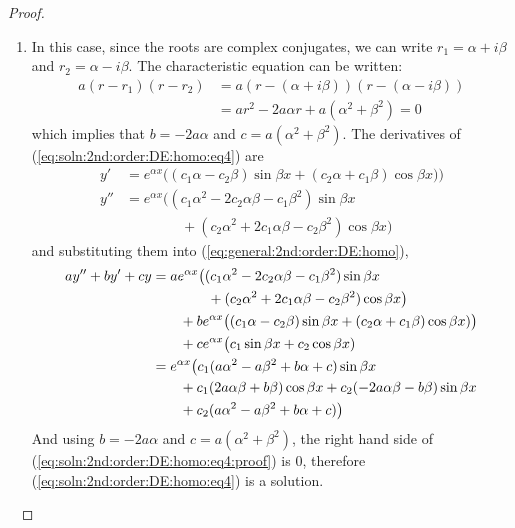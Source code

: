 \begin{proof}
\begin{enumerate}
\item In this case, since the roots are complex conjugates, we can write $r_1=\alpha+i\beta $ and $r_2=\alpha-i\beta$.  The characteristic equation can be written:
%
\begin{align*}
a(r-r_1)(r-r_2) & = a(r-(\alpha + i \beta))(r-(\alpha-i\beta)) \\
& = a r^2 - 2 a \alpha r + a(\alpha^2+\beta^2) = 0
\end{align*}
which implies that $b=-2a \alpha$ and $c=a(\alpha^2+\beta^2)$.
The derivatives of (\ref{eq:soln:2nd:order:DE:homo:eq4}) are
%
\begin{align*}
y' & = e^{\alpha x} \bigl( (c_1 \alpha - c_2 \beta) \sin \beta x + (c_2 \alpha + c_1 \beta) \cos \beta x) \bigr) \\
y'' & = e^{\alpha x} \bigl( (c_1 \alpha^2 -2 c_2 \alpha \beta - c_1 \beta^2) \sin \beta x \\
& \qquad \qquad + (c_2 \alpha^2 + 2 c_1 \alpha \beta - c_2 \beta^2) \cos \beta x\bigr)
\end{align*}
and substituting them into (\ref{eq:general:2nd:order:DE:homo}),
%
\begin{align}
a y'' + by' + cy & = a e^{\alpha x} \bigl( (c_1 \alpha^2 -2 c_2 \alpha \beta - c_1 \beta^2) \sin \beta x   \notag \\
& \qquad \qquad + (c_2 \alpha^2 + 2 c_1 \alpha \beta - c_2 \beta^2) \cos \beta x\bigr) \notag \\
& \qquad + b e^{\alpha x} \bigl( (c_1 \alpha - c_2 \beta) \sin \beta x + (c_2 \alpha + c_1 \beta) \cos \beta x) \bigr)  \notag \\\
& \qquad + c e^{\alpha x} \bigl( c_1 \sin \beta x + c_2 \cos \beta x) \notag \\\
& = e^{\alpha x} \bigl ( c_1 (a\alpha^2-a\beta^2 +b\alpha + c) \sin \beta x   \notag \ \\
& \qquad + c_1 (2a\alpha\beta+b\beta) \cos \beta x + c_2 (-2a\alpha \beta-b\beta) \sin \beta x   \notag \\\
& \qquad + c_2 (a \alpha^2 - a \beta^2 + b \alpha + c) \bigr)  \label{eq:soln:2nd:order:DE:homo:eq4:proof}
\end{align}
And using $b=-2a\alpha$ and $c=a(\alpha^2+\beta^2)$, the right hand side of (\ref{eq:soln:2nd:order:DE:homo:eq4:proof}) is 0, therefore
(\ref{eq:soln:2nd:order:DE:homo:eq4}) is a solution.

\end{enumerate}

~
\end{proof}






